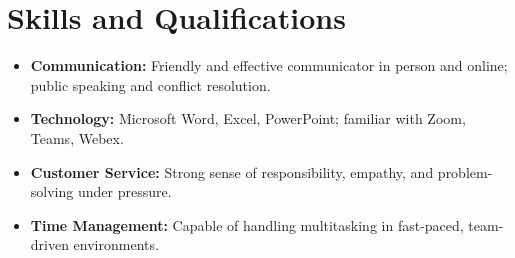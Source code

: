 \documentclass[letterpaper,11pt]{article}
\begin{document}
\section*{Skills and Qualifications}
\begin{itemize}[leftmargin=*]
  \item \textbf{Communication:} Friendly and effective communicator in person and online; public speaking and conflict resolution.
  \item \textbf{Technology:} Microsoft Word, Excel, PowerPoint; familiar with Zoom, Teams, Webex.
  \item \textbf{Customer Service:} Strong sense of responsibility, empathy, and problem-solving under pressure.
  \item \textbf{Time Management:} Capable of handling multitasking in fast-paced, team-driven environments.
\end{itemize}
\end{document}
